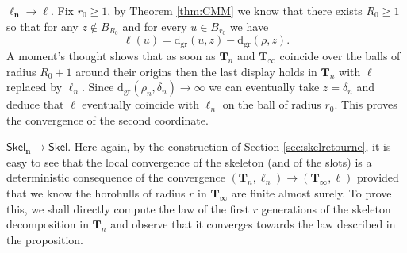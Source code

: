 \documentclass[AHL,XML,longabstracts,Unicode,NoSaveZebib]{cedram}
\begin{document}
$\boldsymbol{\ell_{n} \to \ell}$. Fix $r_{0} \geq 1$, by Theorem \ref{thm:CMM} we know that there exists $R_{0} \geq 1$ so that for any $z \notin B_{R_{0}}$ and for every $u \in B_{r_{0}}$ we have
$$ \ell(u) = \mathrm{d_{gr}}(u,z)- \mathrm{d_{gr}}(\rho,z).$$
A moment's thought shows that as soon as $ \mathbf{T}_{n}$ and $ \mathbf{T}_{\infty}$ coincide over the balls of radius $R_{0}+1$ around their origins then the last display holds in $ \mathbf{T}_{n}$ with $\ell$ replaced by $\ell_{n}$.  Since $ \mathrm{d_{gr}}(\rho_{n}, \delta_{n}) \to \infty$ we can eventually take $z= \delta_{n}$  and deduce that $\ell$ eventually coincide with $\ell_{n}$ on the ball of radius  $r_{0}$. This proves the convergence of the second coordinate.

$\boldsymbol{ \mathsf{Skel}_{n} \to \mathsf{Skel}}$. Here again, by the construction of Section \ref{sec:skelretourne}, it is easy to see that the local convergence of the skeleton (and of the slots) is a deterministic consequence of the convergence $( \mathbf{T}_{n}, \ell_{n}) \to ( \mathbf{T}_{\infty},\ell)$ provided that we know the horohulls of radius $r$ in $ \mathbf{T}_{\infty}$ are finite almost surely. To prove this, we shall directly compute the law of the first $r$ generations of the skeleton decomposition in $ \mathbf{T}_{n}$ and observe that it converges towards the law described in the proposition.
\end{document}
